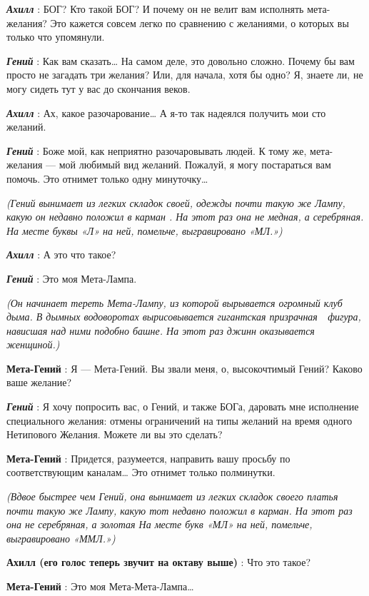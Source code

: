 \emph{\textbf{Ахилл}} : БОГ? Кто такой БОГ? И почему он не велит вам исполнять мета-желания? Это кажется совсем легко по сравнению с желаниями, о которых вы только что упомянули.

\emph{\textbf{Гений}} : Как вам сказать\ldots{} На самом деле, это довольно сложно. Почему бы вам просто не загадать три желания? Или, для начала, хотя бы одно? Я, знаете ли, не могу сидеть тут у вас до скончания веков.

\emph{\textbf{Ахилл}} : Ах, какое разочарование\ldots{} А я-то так надеялся получить мои сто желаний.

\emph{\textbf{Гений}} : Боже мой, как неприятно разочаровывать людей. К тому же, мета-желания --- мой любимый вид желаний. Пожалуй, я могу постараться вам помочь. Это отнимет только одну минуточку\ldots{}

\emph{(Гений вынимает из легких складок своей, одежды почти такую же Лампу, какую он недавно положил в карман . На этот раз она не медная, а серебряная. На месте буквы «Л» на ней, помельче, выгравировано «МЛ.»)}

\emph{\textbf{Ахилл}} : А это что такое?

\emph{\textbf{Гений}} : Это моя Мета-Лампа.

\emph{(Он начинает тереть Мета-Лампу, из которой вырывается огромный клуб дыма. В дымных водоворотах вырисовывается гигантская призрачная~~фигура, нависшая над ними подобно башне. На этот раз джинн оказывается женщиной.)}

\textbf{Мета-Гений} : Я --- Мета-Гений. Вы звали меня, о, высокочтимый Гений? Каково ваше желание?

\emph{\textbf{Гений}} : Я хочу попросить вас, о Гений, и также БОГа, даровать мне исполнение специального желания: отмены ограничений на типы желаний на время одного Нетипового Желания. Можете ли вы это сделать?

\textbf{Мета-Гений} : Придется, разумеется, направить вашу просьбу по соответствующим каналам\ldots{} Это отнимет только полминутки.

\emph{(Вдвое быстрее чем Гений, она вынимает из легких складок своего платья почти такую же Лампу, какую тот недавно положил в карман. На этот раз она не серебряная, а золотая На месте букв «МЛ» на ней, помельче, выгравировано «ММЛ.»)}

\textbf{Ахилл (его голос теперь звучит на октаву выше)} : Что это такое?

\textbf{Мета-Гений} : Это моя Мета-Мета-Лампа\ldots{}

